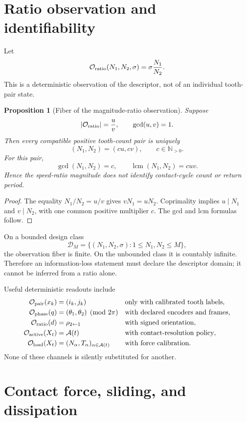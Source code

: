 \documentclass[11pt,a4paper]{article}
\theoremstyle{definition}
\theoremstyle{plain}
\newtheorem{proposition}[definition]{Proposition}
\theoremstyle{remark}
\newcommand{\Ocal}{\mathcal O}
\newcommand{\Acal}{\mathcal A}
\newcommand{\Dcal}{\mathcal D}
\begin{document}
\section{Ratio observation and identifiability}

Let
\[
\Ocal_{\rm ratio}(N_1,N_2,\sigma)
=\sigma\frac{N_1}{N_2}.
\]
This is a deterministic observation of the descriptor, not of an
individual tooth-pair state.

\begin{proposition}[Fiber of the magnitude-ratio observation]
\label{prop:ratio-fiber}
Suppose
\[
\left|\Ocal_{\rm ratio}\right|=\frac{u}{v},
\qquad \gcd(u,v)=1.
\]
Then every compatible positive tooth-count pair is uniquely
\[
(N_1,N_2)=(cu,cv),\qquad c\in\mathbb N_{>0}.
\]
For this pair,
\[
\gcd(N_1,N_2)=c,\qquad
\operatorname{lcm}(N_1,N_2)=cuv.
\]
Hence the speed-ratio magnitude does not identify contact-cycle count
or return period.
\end{proposition}

\begin{proof}
The equality \(N_1/N_2=u/v\) gives \(vN_1=uN_2\).
Coprimality implies \(u\mid N_1\) and \(v\mid N_2\), with one common
positive multiplier \(c\). The gcd and lcm formulas follow.
\end{proof}

On a bounded design class
\[
\Dcal_M=\{(N_1,N_2,\sigma):1\le N_1,N_2\le M\},
\]
the observation fiber is finite. On the unbounded class it is
countably infinite. Therefore an information-loss statement must
declare the descriptor domain; it cannot be inferred from a ratio
alone.

Useful deterministic readouts include
\begin{align*}
\Ocal_{\rm pair}(x_k)&=(i_k,j_k)
&&\text{only with calibrated tooth labels},\\
\Ocal_{\rm phase}(q)&=(\theta_1,\theta_2)\pmod{2\pi}
&&\text{with declared encoders and frames},\\
\Ocal_{\rm ratio}(d)&=\rho_{2\leftarrow1}
&&\text{with signed orientation},\\
\Ocal_{\rm active}(X_t)&=\Acal(t)
&&\text{with contact-resolution policy},\\
\Ocal_{\rm load}(X_t)&=(N_\alpha,T_\alpha)_{\alpha\in\Acal(t)}
&&\text{with force calibration}.
\end{align*}
None of these channels is silently substituted for another.

\section{Contact force, sliding, and dissipation}
\end{document}
